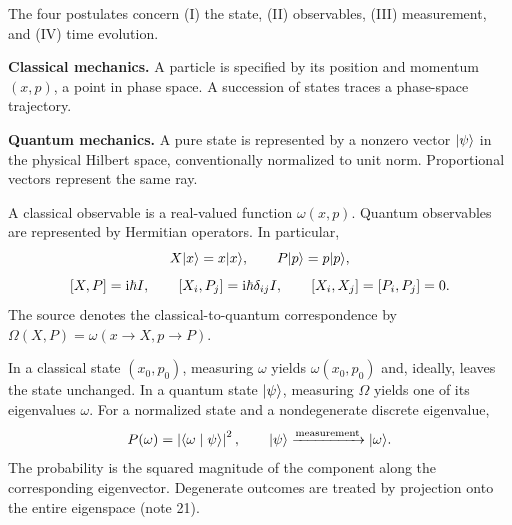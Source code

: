 The four postulates concern (I) the state, (II) observables,
(III) measurement, and (IV) time evolution.

\textbf{Classical mechanics.} A particle is specified by its position
and momentum $(x,p)$, a point in phase space. A succession of states
traces a phase-space trajectory.
\begin{center}
\end{center}
\textbf{Quantum mechanics.} A pure state is represented by a nonzero
vector $\lvert \psi\rangle$ in the physical Hilbert space, conventionally
normalized to unit norm. Proportional vectors represent the same ray.

A classical observable is a real-valued function $\omega(x,p)$.
Quantum observables are represented by Hermitian operators. In
particular,
\[
 X\lvert x\rangle=x\lvert x\rangle,\qquad P\lvert p\rangle=p\lvert p\rangle,
\]
\[
 \left[X,P\right]=\mathrm{i}\hbar I,
 \qquad \left[X_i,P_j\right]=\mathrm{i}\hbar\delta_{ij}I,
 \qquad \left[X_i,X_j\right]=\left[P_i,P_j\right]=0.
\]
The source denotes the classical-to-quantum correspondence by
$\Omega(X,P)=\omega(x\to X,p\to P)$.

In a classical state $(x_0,p_0)$, measuring $\omega$ yields
$\omega(x_0,p_0)$ and, ideally, leaves the state unchanged.
In a quantum state $\lvert \psi\rangle$, measuring $\Omega$ yields one of its
eigenvalues $\omega$. For a normalized state and a nondegenerate
discrete eigenvalue,
\[
 P(\omega)=\left\lvert\langle \omega\mid \psi\rangle\right\rvert^2,
 \qquad \lvert \psi\rangle\xrightarrow{\text{measurement}}\lvert \omega\rangle.
\]
The probability is the squared magnitude of the component along
the corresponding eigenvector. Degenerate outcomes are treated by
projection onto the entire eigenspace (note 21).

